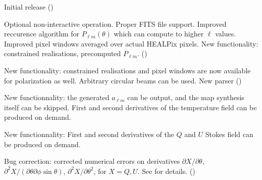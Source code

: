 \begin{release}
  \begin{relist}
    \item Initial release ()
    \item Optional non-interactive operation. Proper FITS file
    support. Improved reccurence algorithm for $P_{\ell m}(\theta)$ which can compute to higher $\ell$ values. Improved pixel windows averaged over
    actual HEALPix pixels. New functionality: constrained realisations, precomputed
    $P_{\ell m}$. ()
    \item New functionality: constrained realisations and pixel
    windows are now available for polarization as well. Arbitrary
    circular beams can be used. New parser ()
    \item New functionnality: the generated $a_{\ell m}$ can be output, and the map
    synthesis itself can be skipped. First and second derivatives of the
    temperature field can be produced on demand.
    \item New functionnality: First and second derivatives of the
    $Q$ and $U$ Stokes field can be produced on demand.
    \item Bug correction: corrected numerical errors on derivatives 
$\partial X/\partial\theta$, 
$\partial^2 X/(\partial\theta\partial\phi\sin\theta)$, 
$\partial^2 X/\partial \theta^2$, 
for $X=Q,U$. See  for details.
  ()
  \end{relist}
\end{release}

